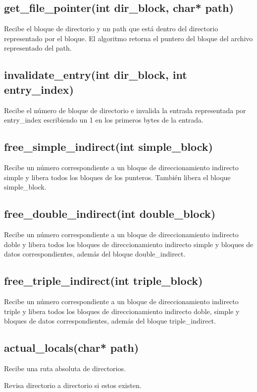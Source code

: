 \documentclass[12pt]{article}
\begin{document}
\subsection{get\_file\_pointer(int dir\_block, char* path)}
Recibe el bloque de directorio y un path que está dentro del directorio representado por el bloque. 
El algoritmo retorna el puntero del bloque del archivo representado del path.

\subsection{invalidate\_entry(int dir\_block, int entry\_index)}
Recibe el número de bloque de directorio e invalida la entrada representada por entry\_index escribiendo un 1 en los primeros bytes de la entrada.

\subsection{free\_simple\_indirect(int simple\_block)}
Recibe un número correspondiente a un bloque de direccionamiento indirecto simple y libera todos los bloques de los punteros. También libera el bloque simple\_block.

\subsection{free\_double\_indirect(int double\_block)}
Recibe un número correspondiente a un bloque de direccionamiento indirecto doble y libera todos los bloques de direccionamiento indirecto simple y bloques de datos correspondientes, además del bloque double\_indirect.

\subsection{free\_triple\_indirect(int triple\_block)}
Recibe un número correspondiente a un bloque de direccionamiento indirecto triple y libera todos los bloques de direccionamiento indirecto doble, simple y bloques de datos correspondientes, además del bloque triple\_indirect.

\subsection{actual\_locals(char* path)}
Recibe una ruta absoluta de directorios.

Revisa directorio a directorio si estos existen.
\end{document}
